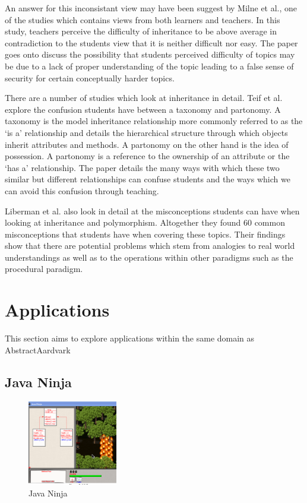 \documentclass{l4proj}
\begin{document}
An answer for this inconsistant view may have been suggest by Milne et al.\cite{dilatp}, one of the studies which contains views from both learners and teachers. In this study, teachers perceive the difficulty of inheritance to be above average in contradiction to the students view that it is neither difficult nor easy. The paper goes onto discuss the possibility that students perceived difficulty of topics may be due to a lack of proper understanding of the topic leading to a false sense of security for certain conceptually harder topics. 

There are a number of studies\cite{partonomyAndTaxonomy,diffInheritancePolymorphism,taxonomyTaxonomy} which look at inheritance in detail. Teif et al.\cite{partonomyAndTaxonomy} explore the confusion students have between a taxonomy and partonomy. A taxonomy is the model inheritance relationship more commonly referred to as the `is a' relationship and details the hierarchical structure through which objects inherit attributes and methods. A partonomy on the other hand is the idea of possession. A partonomy is a reference to the ownership of an attribute or the `has a' relationship. The paper details the many ways with which these two similar but different relationships can confuse students and the ways which we can avoid this confusion through teaching. 

Liberman et al.\cite{diffInheritancePolymorphism} also look in detail at the misconceptions students can have when looking at inheritance and polymorphism. Altogether they found 60 common misconceptions that students have when covering these topics. Their findings show that there are potential problems which stem from analogies to real world understandings as well as to the operations within other paradigms such as the procedural paradigm. 

\section{Applications}
\label{applications}

This section aims to explore applications within the same domain as AbstractAardvark
\subsection{Java Ninja}
\begin{figure}[h]
    \centering
    \includegraphics[width=0.35\textwidth]{images/javaNinja}
    \caption{Java Ninja}
    \label{fig:javaNinja}
\end{figure}
\end{document}
